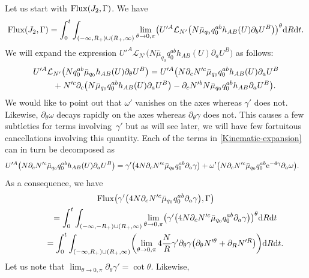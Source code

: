 \documentclass[pdftex]{sigma}
\def\ptl{\partial}%
\numberwithin{equation}{section}
\begin{document}
Let us start with ${\rm Flux} (J_2, \Gamma)$. We have
\begin{align*}
{\rm Flux}(J_2, \Gamma)= \int^t_0 \int_{ (-\infty, R_+) \cup (R_+, \infty) } \lim_{\theta \to 0, \pi} \bigl( U'^A \mathcal{L}_{N'} \bigl(N \bar{\mu}_{q_0} q^{ab}_0 h_{AB}(U) \ptl_b U^B\bigr) \bigr)^\theta {\rm d}R {\rm d}t .\notag
\end{align*}
We will expand the expression $U'^A \mathcal{L}_{N'} \bigl(N \bar{\mu}_{q_0} q_0^{ab} h_{AB}(U) \ptl_a U^B\bigr)$ as follows:
\begin{gather}
U'^A \mathcal{L}_{N'} \bigl(N q^{ab}_0\bar{\mu}_{q_0} h_{AB}(U) \ptl_\theta U^B \bigr)= U'^A \bigl(N \ptl_c N'^c \bar{\mu}_{q_0} q^{ab}_0 h_{AB}(U) \ptl_a U^B \notag\\
\qquad{}+ N'^c \ptl_c \bigl(N \bar{\mu}_{q_0} q_0^{ab} h_{AB}(U) \ptl_a U^B\bigr) - \ptl_c N'^b N \bar{\mu}_{q_0} q^{ab}_0 h_{AB} \ptl_a U^B\bigr).\label{Kinematic-expansion}
\end{gather}
We would like to point out that $\omega'$ vanishes on the axes whereas $\gamma'$ does not. Likewise, $\ptl_\theta \omega$ decays rapidly on the axes whereas $\ptl_\theta \gamma$ does not. This causes a few subtleties for terms involving~$\gamma'$ but as will see later, we will have few fortuitous cancellations involving this quantity.
Each of the terms in \eqref{Kinematic-expansion} can in turn be decomposed as
\begin{align*}
U'^A \bigl(N \ptl_c N'^c \bar{\mu}_{q_0} q^{ab}_0 h_{AB}(U) \ptl_a U^B\bigr) &{}= \gamma' \bigl(4 N \ptl_c N'^c \bar{\mu}_{q_0} q^{ab} _0 \ptl_a \gamma\bigr)
 + \omega' \bigl(N \ptl_c N'^c \bar{\mu}_{q_0} q^{ab} _0 {\rm e}^{-4 \gamma} \ptl_a \omega\bigr).
\end{align*}
As a consequence, we have
\begin{gather}
{\rm Flux} \bigl(\gamma' \bigl(4 N \ptl_c N'^c \bar{\mu}_{q_0} q^{ab} _0 \ptl_a \gamma\bigr), \Gamma\bigr) \notag\\
\qquad{}= \int^t_0 \int_{ (-\infty, -R_+) \cup (R_+, \infty) } \lim_{\theta \to 0, \pi} \bigl(\gamma' \bigl(4 N \ptl_c N'^c \bar{\mu}_{q_0} q^{ab} _0 \ptl_a \gamma\bigr) \bigr)^\theta {\rm d}R {\rm d}t \notag\\
\qquad{}= \int^t_0 \int_{ (-\infty, R_+) \cup (R_+, \infty) } \biggl( \lim_{\theta \to 0, \pi} 4 \frac{N}{R} \gamma' \ptl_\theta \gamma \bigl(\ptl_\theta N'^\theta + \ptl_R N'^R\bigr) \biggr) {\rm d}R {\rm d}t.\label{kin-flux-axes-1}
\end{gather}
Let us note that $\lim_{\theta \to 0, \pi} \ptl_\theta \gamma' = \cot \theta$. Likewise,
\end{document}
